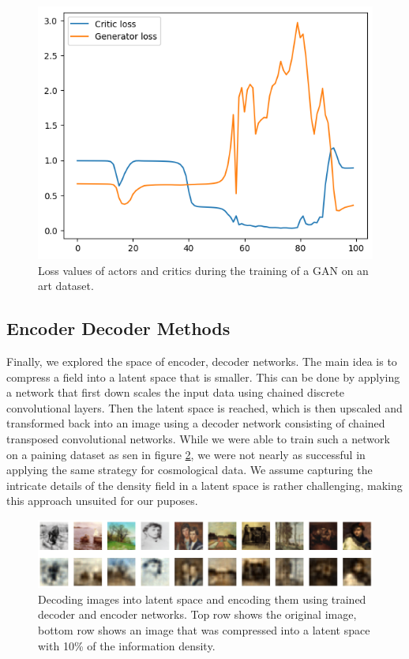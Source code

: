 \documentclass{article}
\begin{document}
{\begin{appendices}
\begin{figure}[h]
    \centering
    \includegraphics[width=0.5\linewidth]{img/gan.png}
    \caption{Loss values of actors and critics during the training of a GAN on an art dataset.}
    \label{fig:gan}
\end{figure}

\subsection{Encoder Decoder Methods}
\label{encoder-decoder}

Finally, we explored the space of encoder, decoder networks. The main idea is to compress a field into a latent space that is smaller. This can be done by applying a network that first down scales the input data using chained discrete convolutional layers. Then the latent space is reached, which is then upscaled and transformed back into an image using a decoder network consisting of chained transposed convolutional networks. While we were able to train such a network on a paining dataset as sen in figure \ref{fig:ed}, we were not nearly as successful in applying the same strategy for cosmological data. We assume capturing the intricate details of the density field in a latent space is rather challenging, making this approach unsuited for our puposes.

\begin{figure}[h]
    \centering
    \includegraphics[width=0.75\linewidth]{img/reconstruction.png}
    \caption{Decoding images into latent space and encoding them using trained decoder and encoder networks. Top row shows the original image, bottom row shows an image that was compressed into a latent space with 10\% of the information density.}
    \label{fig:ed}
\end{figure}



\end{appendices}}
\end{document}
